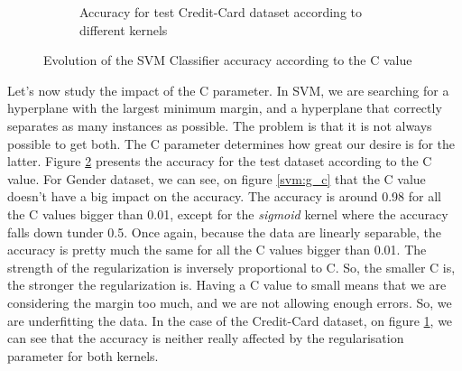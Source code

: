 \documentclass[10pt]{article}
\begin{document}
\begin{figure}
\begin{subfigure}[]{0.45\columnwidth}
				\caption{Accuracy for test Credit-Card dataset according to different kernels}
				\label{svm:cc_c}
			\end{subfigure}
			\caption{Evolution of the SVM Classifier accuracy according to the C value}
			\label{svm:c}
		\end{figure}

		Let's now study the impact of the C parameter. In SVM, we are searching for a hyperplane with the largest minimum margin, and a hyperplane that correctly separates as many instances as possible. The problem is that it is not always possible to get both. The C parameter determines how great our desire is for the latter. Figure \ref{svm:c} presents the accuracy for the test dataset according to the C value.
		For Gender dataset, we can see, on figure \ref{svm:g_c} that the C value doesn't have a big impact on the accuracy. The accuracy is around 0.98 for all the C values bigger than 0.01, except for the \textit{sigmoid} kernel where the accuracy falls down tunder 0.5. Once again, because the data are linearly separable, the accuracy is pretty much the same for all the C values bigger than 0.01.
		The strength of the regularization is inversely proportional to C. So, the smaller C is, the stronger the regularization is. Having a C value to small means that we are considering the margin too much, and we are not allowing enough errors. So, we are underfitting the data.
		In the case of the Credit-Card dataset, on figure \ref{svm:cc_c}, we can see that the accuracy is neither really affected by the regularisation parameter for both kernels.
\end{document}
